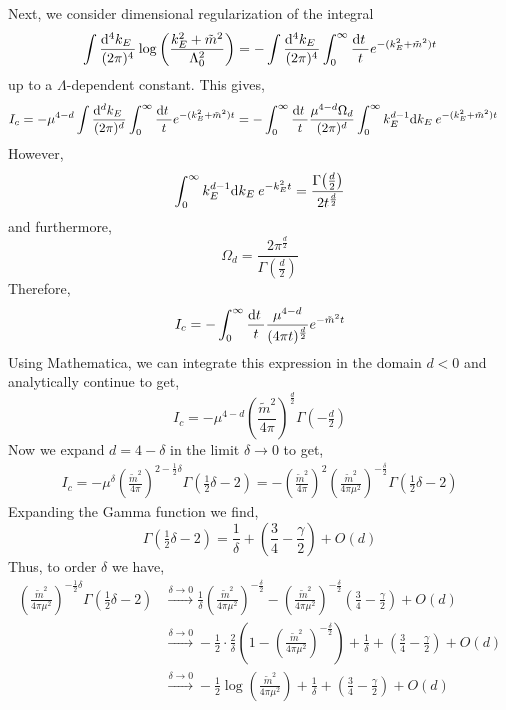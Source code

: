 \documentclass[12pt]{article}
\begin{document}
Next, we consider dimensional regularization of the integral
\begin{align*}
\int \frac{\mathrm{d}^{4} k_E \:}{(2\pi)^4} \log{\left( \frac{k_E^2 + \tilde{m}^2}{\Lambda_0^2} \right)} = - \int \frac{\mathrm{d}^{4} k_E \:}{(2\pi)^4} \int_0^{\infty} \frac{\mathrm{d}t \:}{t} e^{-(k_E^2 + \tilde{m}^2)t}  
\end{align*}
up to a $\Lambda$-dependent constant. This gives,
\begin{align*}
I_c & = - \mu^{4-d} \int \frac{\mathrm{d}^{d} k_E \:}{(2\pi)^d} \int_0^{\infty} \frac{\mathrm{d}t \:}{t} e^{-(k_E^2 + \tilde{m}^2)t}  = - \int_0^{\infty} \frac{\mathrm{d}t \:}{t} \frac{\mu^{4 - d} \Omega_d}{(2 \pi)^d} \int_0^{\infty} k_E^{d-1} \mathrm{d}k_E \: e^{-(k_E^2 + \tilde{m}^2)t} 
\end{align*}
However,
\[ \int_0^{\infty} k_E^{d-1} \mathrm{d}k_E \: e^{-k_E^2 t} = \frac{\Gamma{\left( \tfrac{d}{2} \right)}}{2 t^{\frac{d}{2}}}  \]
and furthermore,
\[ \Omega_d = \frac{2 \pi^{\frac{d}{2}}}{\Gamma\left( \tfrac{d}{2} \right)} \]
Therefore,
\[ I_c = - \int_0^\infty \frac{\mathrm{d}t \:}{t} \frac{\mu^{4 - d}}{(4 \pi t)^{\frac{d}{2}}} e^{-\tilde{m}^2 t} \]
Using Mathematica, we can integrate this expression in the domain $d < 0$ and analytically continue to get,
\[ I_c = - \mu^{4 - d} \left( \frac{\tilde{m}^2}{4 \pi} \right)^{\frac{d}{2}} \Gamma{\left(-\tfrac{d}{2} \right)} \]
Now we expand $d = 4 - \delta$ in the limit $\delta \to 0$ to get,
\begin{align*}
I_c = - \mu^{\delta} \left( \frac{\tilde{m}^2}{4 \pi} \right)^{2 - \tfrac{1}{2} \delta} \Gamma{\left(\tfrac{1}{2} \delta - 2 \right)} 
=
 - \left( \frac{\tilde{m}^2}{4 \pi} \right)^2 \left( \frac{\tilde{m}^2}{4 \pi \mu^2} \right)^{-\tfrac{\delta}{2}} \Gamma{\left(\tfrac{1}{2} \delta - 2 \right)}
\end{align*}
Expanding the Gamma function we find,
\[ \Gamma{\left(\tfrac{1}{2} \delta - 2 \right)} = \frac{1}{\delta} + \left( \frac{3}{4} - \frac{\gamma}{2} \right) + O(d) \]
Thus, to order $\delta$ we have,  
\begin{align*}
\left( \frac{\tilde{m}^2}{4 \pi \mu^2} \right)^{-\tfrac{1}{2} \delta} \Gamma{\left(\tfrac{1}{2} \delta - 2 \right)}
&  \xrightarrow{\delta \to 0} \frac{1}{\delta} \left( \frac{\tilde{m}^2}{4 \pi \mu^2} \right)^{-\tfrac{\delta}{2}}  - \left( \frac{\tilde{m}^2}{4 \pi \mu^2} \right)^{-\tfrac{\delta}{2}} \left( \frac{3}{4} - \frac{\gamma}{2} \right) + O(d)
\\
&  
\xrightarrow{\delta \to 0} - \frac{1}{2} \cdot \frac{2}{\delta} \left( 1 - \left( \frac{\tilde{m}^2}{4 \pi \mu^2} \right)^{-\tfrac{\delta}{2}} \right) + \frac{1}{\delta} + \left( \frac{3}{4} - \frac{\gamma}{2} \right) + O(d)
\\
&  
\xrightarrow{\delta \to 0} - \frac{1}{2} \log{\left( \frac{\tilde{m}^2}{4 \pi \mu^2} \right)} + \frac{1}{\delta} + \left( \frac{3}{4} - \frac{\gamma}{2} \right) + O(d)
\end{align*}
\end{document}
